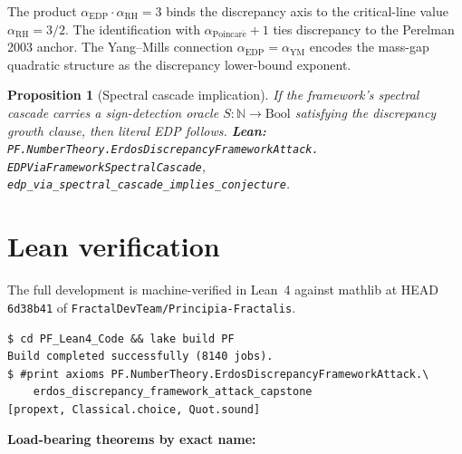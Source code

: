 \documentclass[11pt,a4paper]{article}
\theoremstyle{plain}
\newtheorem{proposition}[theorem]{Proposition}
\theoremstyle{definition}
\begin{document}
The product $\alpha_{\mathrm{EDP}} \cdot \alpha_{\mathrm{RH}} = 3$ binds
the discrepancy axis to the critical-line value
$\alpha_{\mathrm{RH}} = 3/2$. The identification with
$\alpha_{\mathrm{Poincar\acute e}} + 1$ ties discrepancy to the
Perelman 2003 anchor. The Yang--Mills connection
$\alpha_{\mathrm{EDP}} = \alpha_{\mathrm{YM}}$ encodes the mass-gap
quadratic structure as the discrepancy lower-bound exponent.

\begin{proposition}[Spectral cascade implication]
\label{prop:cascade}
If the framework's spectral cascade carries a sign-detection oracle
$S : \mathbb{N} \to \mathrm{Bool}$ satisfying the discrepancy growth
clause, then literal EDP follows.
\textbf{Lean:}
\texttt{PF.NumberTheory.ErdosDiscrepancyFrameworkAttack.\\
EDPViaFrameworkSpectralCascade},
\texttt{edp\_via\_spectral\_cascade\_implies\_conjecture}.
\end{proposition}

\section{Lean verification}
\label{sec:lean}

The full development is machine-verified in Lean~4 against mathlib at
HEAD \texttt{6d38b41} of \texttt{FractalDevTeam/Principia-Fractalis}.

\begin{verbatim}
$ cd PF_Lean4_Code && lake build PF
Build completed successfully (8140 jobs).
$ #print axioms PF.NumberTheory.ErdosDiscrepancyFrameworkAttack.\
    erdos_discrepancy_framework_attack_capstone
[propext, Classical.choice, Quot.sound]
\end{verbatim}

\noindent\textbf{Load-bearing theorems by exact name:}
\end{document}
